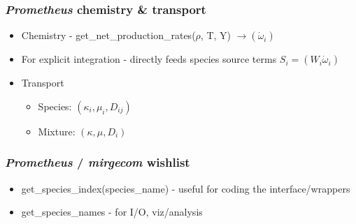 \begin{frame}\frametitle{\textit{Prometheus} chemistry \& transport}
\begin{itemize}
\item Chemistry - get\_net\_production\_rates($\rho$, T, Y) $\rightarrow (\dot{\omega}_i)$
\item For explicit integration - directly feeds species source terms $S_i = (W_i \dot{\omega}_i)$
\item Transport
   \begin{itemize}
      \item Species:  $(\kappa_i, \mu_i, D_{ij})$
      \item Mixture: $(\kappa, \mu, D_i)$
   \end{itemize}
\end{itemize}
\end{frame}

\begin{frame}\frametitle{\textit{Prometheus} / \textit{mirgecom} wishlist}
\begin{itemize}
   \item get\_species\_index(species\_name) - useful for coding the interface/wrappers
   \item get\_species\_names - for I/O, viz/analysis
\end{itemize}           
\end{frame}
